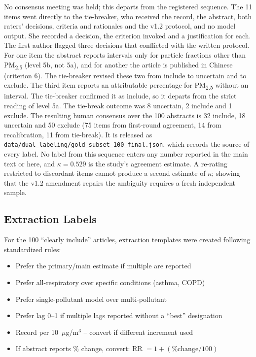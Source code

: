 \documentclass[11pt]{article}
\begin{document}
No consensus meeting was held; this departs from the registered sequence. The 11 items went directly to the tie-breaker, who received the record, the abstract, both raters' decisions, criteria and rationales and the v1.2 protocol, and no model output. She recorded a decision, the criterion invoked and a justification for each. The first author flagged three decisions that conflicted with the written protocol. For one item the abstract reports intervals only for particle fractions other than PM\textsubscript{2.5} (level 5b, not 5a), and for another the article is published in Chinese (criterion 6). The tie-breaker revised these two from include to uncertain and to exclude. The third item reports an attributable percentage for PM\textsubscript{2.5} without an interval. The tie-breaker confirmed it as include, so it departs from the strict reading of level 5a. The tie-break outcome was 8 uncertain, 2 include and 1 exclude. The resulting human consensus over the 100 abstracts is 32 include, 18 uncertain and 50 exclude (75 items from first-round agreement, 14 from recalibration, 11 from tie-break). It is released as \texttt{data/dual\_labeling/gold\_subset\_100\_final.json}, which records the source of every label. No label from this sequence enters any number reported in the main text or here, and $\kappa=0.529$ is the study's agreement estimate. A re-rating restricted to discordant items cannot produce a second estimate of $\kappa$; showing that the v1.2 amendment repairs the ambiguity requires a fresh independent sample.

\subsection{Extraction Labels}

For the 100 ``clearly include'' articles, extraction templates were created following standardized rules:
\begin{itemize}
  \item Prefer the primary/main estimate if multiple are reported
  \item Prefer all-respiratory over specific conditions (asthma, COPD)
  \item Prefer single-pollutant model over multi-pollutant
  \item Prefer lag 0--1 if multiple lags reported without a ``best'' designation
  \item Record per 10~$\mu$g/m$^3$ -- convert if different increment used
  \item If abstract reports \% change, convert: RR $= 1 + (\%\text{change} / 100)$
\end{itemize}
\end{document}
